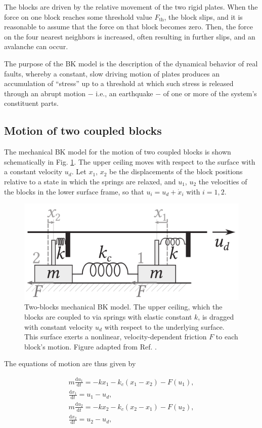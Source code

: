The blocks are driven by the relative movement of the two rigid plates. When the force on one block
reaches some threshold value $F_{\text{th}}$, the block slips, and it is reasonable to assume that the
force on that block becomes zero. Then, the force on the four nearest neighbors is increased, often
resulting in further slips, and an avalanche can occur.

The purpose of the BK model is the description of the dynamical behavior of
real faults, whereby a constant, slow driving motion of plates produces an accumulation of ``stress''
up to a threshold at which such stress is released through an abrupt motion $-$ i.e., an earthquake $-$
of one or more of the system's constituent parts.

\subsection{Motion of two coupled blocks}
\label{subsec: diff eqs for two blocks}

The mechanical BK model for the motion of two coupled blocks is shown schematically in
Fig. \ref{fig: 2 blocks motion}. The upper ceiling moves with respect to the surface with
a constant velocity $u_d$. Let $x_1$, $x_2$ be the displacements of the block positions
relative to a state in which the springs are relaxed, and $u_1$, $u_2$ the velocities of the blocks in the
lower surface frame, so that $u_i=u_d+\dot{x}_i$ with $i=1,2$.

\begin{figure}[H]
    \centering
    \includegraphics[width=0.5\linewidth]{images/bk_2_blocks.png}
    \caption{Two-blocks mechanical BK model. The upper ceiling, which the blocks
    are coupled to via springs with elastic constant $k$, is dragged with constant
    velocity $u_d$ with respect to the underlying surface. This surface exerts a nonlinear,
    velocity-dependent friction $F$ to each block's motion. Figure adapted from Ref. \cite{ref:electronic_analog}.}
    \label{fig: 2 blocks motion}
\end{figure}

The equations of motion are thus given by

\begin{equation}
\label{eq: 2 block motion}
    \begin{gathered}
    m\frac{\text{d}u_1}{\text{d}t} = -kx_1 - k_c(x_1-x_2) - F(u_1),\\[10pt]
    \frac{\text{d}x_1}{\text{d}t} = u_1 - u_d,\\[10pt]
    m\frac{\text{d}u_2}{\text{d}t} = -kx_2 - k_c(x_2-x_1) - F(u_2),\\[10pt]
    \frac{\text{d}x_2}{\text{d}t} = u_2 - u_d,
\end{gathered}
\end{equation}

